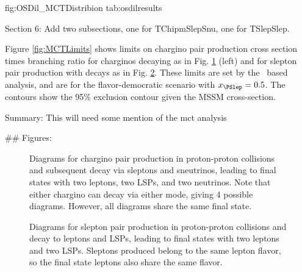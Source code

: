 fig:OSDil_MCTDistribion
tab:osdilresults


Section 6: Add two subsections, one for TChipmSlepSnu, one for TSlepSlep.

Figure \ref{fig:MCTLimits} shows limits on chargino pair production cross section times branching ratio for charginos decaying as in Fig. \ref{fig:TChipmSlepSnuDiagram} (left) and for slepton pair production with decays as in Fig. \ref{fig:TSlepSlepDiagram}. These limits are set by the \mctp\ based analysis, and are for the flavor-democratic scenario with $x_{\PSlep}=0.5$. The contours show the 95\% exclusion contour given the MSSM cross-section.

Summary: This will need some mention of the mct analysis

## Figures:

\begin{figure}
    \begin{center}
        \caption{Diagrams for chargino pair production in proton-proton collisions and subsequent decay via sleptons and sneutrinos, leading to final states with two leptons, two LSPs, and two neutrinos. Note that either chargino can decay via either mode, giving 4 possible diagrams. However, all diagrams share the same final state.}
        \label{fig:TChipmSlepSnuDiagram}
    \end{center}
\end{figure}

\begin{figure}
    \begin{center}
        \caption{Diagrams for slepton pair production in proton-proton collisions and decay to leptons and LSPs, leading to final states with two leptons and two LSPs. Sleptons produced belong to the same lepton flavor, so the final state leptons also share the same flavor.}
        \label{fig:TSlepSlepDiagram}
    \end{center}
\end{figure}

